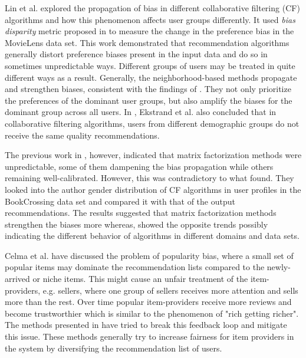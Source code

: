 Lin et al. \cite{lin2019crank} explored the propagation of bias in different collaborative filtering (CF) algorithms and how this phenomenon affects user groups differently. It used \textit{bias disparity} metric proposed in \cite{tsintzou2018bias} to measure the change in the preference bias in the MovieLens data set. This work demonstrated that recommendation algorithms generally distort preference biases present in the input data and do so in sometimes unpredictable ways. Different groups of users may be treated in quite different ways as a result. Generally, the neighborhood-based methods propagate and strengthen biases, consistent with the findings of \cite{jannach2015recommenders}. They not only prioritize the preferences of the dominant user groups, but also amplify the biases for the dominant group across all users. In \cite{ekstrand2018all}, Ekstrand et al. also concluded that in collaborative filtering algorithms, users from different demographic groups do not receive the same quality recommendations.

The previous work in \cite{lin2019crank}, however, indicated that matrix factorization methods were unpredictable, some of them dampening the bias propagation while others remaining well-calibrated. However, this was contradictory to what \cite{ekstrand2018exploring} found. They looked into the author gender distribution of CF algorithms in user profiles in the BookCrossing data set and compared it with that of the output recommendations. The results suggested that matrix factorization methods strengthen the biases more whereas, \cite{lin2019crank} showed the opposite trends possibly indicating the different behavior of algorithms in different domains and data sets.

Celma et al. \cite{celma2008hits} have discussed the problem of popularity bias, where a small set of popular items may dominate the recommendation lists compared to the newly-arrived or niche items. This might cause an unfair treatment of the item-providers, e.g. sellers, where one group of sellers receives more attention and sells more than the rest. Over time popular item-providers receive more reviews and become trustworthier which is similar to the phenomenon of "rich getting richer". The methods presented in \cite{abdollahpouri2017controlling, kamishima2014correcting} have tried to break this feedback loop and mitigate this issue. These methods generally try to increase fairness for item providers in the system by diversifying the recommendation list of users. 

